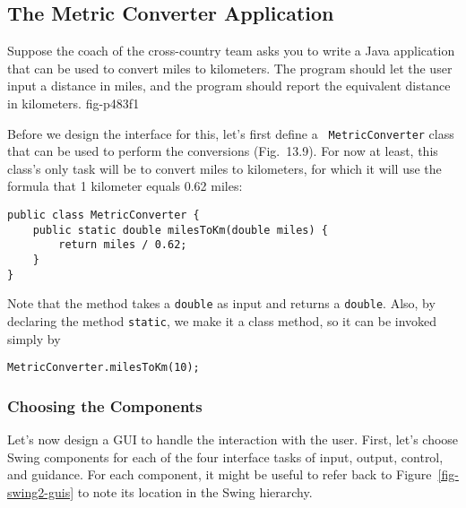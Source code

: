 \subsection{The Metric Converter Application}
\noindent Suppose the coach of the cross-country team asks you to write a Java
application that can be used to convert miles to kilometers.  The
program should let the user input a distance in miles, and the program should
report the equivalent distance in kilometers.
{fig-p483f1}


Before we design the interface for this, let's first define a {\tt
Metric\-Converter} class that can be used to perform the
conversions (Fig.~13.9).  For now at least, this class's
only task will be to convert miles to kilometers, for which it will
use the formula that 1 kilometer equals 0.62 miles:

\begin{jjjlisting}
\begin{lstlisting}
public class MetricConverter {
    public static double milesToKm(double miles) {
        return miles / 0.62;
    }
}
\end{lstlisting}
\end{jjjlisting}

\noindent Note that the method takes a {\tt double} as input
and returns a {\tt double}. Also, by declaring the method {\tt static},
we make it a class method, so it can be invoked simply by

\begin{jjjlisting}
\begin{lstlisting}
MetricConverter.milesToKm(10);
\end{lstlisting}
\end{jjjlisting}

\subsubsection*{Choosing the Components}
\noindent Let's now design a GUI to handle the interaction with the user.
First, let's choose Swing components for each of the four interface
tasks of input, output, control, and guidance.  For each component, it
might be useful to refer back to Figure~\ref{fig-swing2-guis} to note its
location in the Swing hierarchy.

